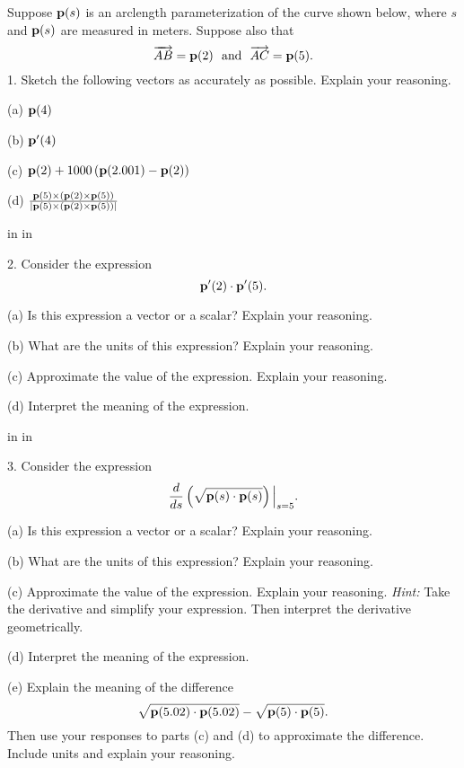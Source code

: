 \documentclass{ximera}
\newcommand{\pskip}{\vskip 0.1 in}
\begin{document}
\begin{question}  \label{Q43esdfgtgre}
Suppose ${\bf p}(s)$ is an arclength parameterization of the curve shown below, where $s$  and ${\bf p}(s)$ are measured in meters. Suppose also that
\[
   \overrightarrow{AB} = {\bf p}(2) \,\,\,\, \text{and} \,\,\,\, \overrightarrow{AC} = {\bf p}(5) .
\]
1. Sketch the following vectors as accurately as possible. Explain your reasoning.

(a) ${\bf p}(4)$

(b) ${\bf p}^\prime(4)$

(c) ${\bf p}(2) + 1000\left( {\bf p}(2.001)-{\bf p}(2)  \right)$

(d) $\frac{{\bf p}(5)\times (  {\bf p}(2)\times {\bf p}(5) )}{| {\bf p}(5)\times (  {\bf p}(2)\times {\bf p}(5) ) |}$

\pskip \pskip

2. Consider the expression
\[
   {\bf p}^\prime(2)\cdot {\bf p}^\prime(5) .
\]

(a) Is this expression a vector or a scalar? Explain your reasoning.

(b) What are the units of this expression? Explain your reasoning.

(c) Approximate the value of the expression. Explain your reasoning.

(d) Interpret the meaning of the expression. 


\pskip \pskip

3. Consider the expression
\[
    \frac{d}{ds} \left( \sqrt{{\bf p}(s) \cdot {\bf p}(s)} \right)\Big|_{s=5} .
\]

(a) Is this expression a vector or a scalar? Explain your reasoning.

(b) What are the units of this expression? Explain your reasoning.

(c) Approximate the value of the expression. Explain your reasoning. {\it Hint:} Take the derivative and simplify your expression. Then interpret the derivative geometrically. 

(d) Interpret the meaning of the expression. 

(e) Explain the meaning of the difference
\[
      \sqrt{{\bf p}(5.02) \cdot {\bf p}(5.02)} - \sqrt{{\bf p}(5) \cdot {\bf p}(5)} .
\]
Then use your responses to parts (c) and (d) to approximate the difference. Include units and explain your reasoning.


 
\begin{onlineOnly}
    \begin{center}
\end{center}
\end{onlineOnly}
\end{question}
\end{document}
